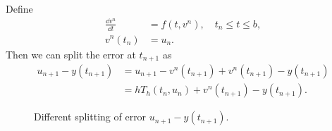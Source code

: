 \documentclass[10pt]{amsart}
\begin{document}
Define
\begin{equation}
\begin{aligned}
\frac{\dd v^n}{\dd t} &= f(t, v^n), \quad t_n \leq t \leq b, \\
v^n(t_n) &= u_n.
\end{aligned}
\end{equation}
Then we can split the error at $t_{n+1}$ as
$$
\begin{aligned}
u_{n+1} - y(t_{n+1}) &= u_{n+1} - v^n(t_{n+1}) + v^n(t_{n+1}) - y(t_{n+1}) \\
&= h T_h(t_n, u_n) + v^n(t_{n+1}) - y(t_{n+1}).
\end{aligned}
$$
\begin{figure}[htbp]
\label{fig:}
\caption{Different splitting of error $u_{n+1} -y(t_{n+1})$.}
\end{figure}
\end{document}
